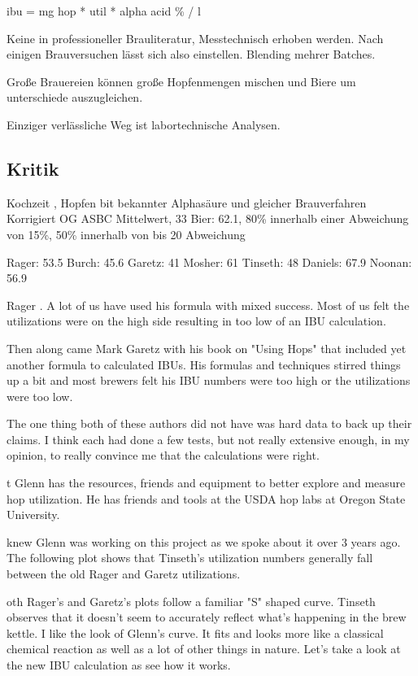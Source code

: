 \documentclass[a4paper,parskip=half]{scrartcl}
\begin{document}
\parencite[51]{Holle2010}
ibu = mg hop * util * alpha acid \% / l

\parencite[127]{Garetz1994} 
Keine in professioneller Brauliteratur, Messtechnisch erhoben
werden. Nach einigen Brauversuchen lässt sich also einstellen.
Blending mehrer Batches.

\parencite[76]{Daniels1996}
Große Brauereien können große Hopfenmengen mischen und
Biere um unterschiede auszugleichen.

\parencite[51]{Holle2010}
Einziger verlässliche Weg ist labortechnische Analysen.



\subsection*{Kritik}

\parencite{Bonham2001}
Kochzeit , Hopfen bit bekannter Alphasäure und gleicher Brauverfahren
Korrigiert OG
ASBC Mittelwert, 33 Bier: 62.1, 80\% innerhalb einer Abweichung von 15\%, 50\% innerhalb
von  bis 20 Abweichung

Rager: 53.5
Burch: 45.6
Garetz: 41
Mosher: 61
Tinseth: 48
Daniels: 67.9
Noonan: 56.9

\parencite{Jones1995}
Rager
. A lot of us have used his formula with mixed success. Most of us felt
the utilizations were on the high side resulting in too low of an IBU calculation.

Then along came Mark Garetz with his book on "Using Hops" that included yet another formula to
calculated IBUs. His formulas and techniques stirred things up a bit and most brewers felt his IBU
numbers were too high or the utilizations were too low.

The one thing both of these authors did not have was hard data to back up their claims. I think each had
done a few tests, but not really extensive enough, in my opinion, to really convince me that the
calculations were right.

t Glenn has the resources, friends
and equipment to better explore and measure hop utilization. He has friends and tools at the USDA hop
labs at Oregon State University.

knew Glenn was working on this project as we spoke about it over 3 years ago.
The following plot shows that Tinseth's utilization numbers generally fall between the
old Rager and Garetz utilizations.

oth Rager’s and Garetz’s plots follow a familiar "S" shaped curve. Tinseth observes that
it doesn't seem to accurately reflect what's happening in the brew kettle.
I like the look of Glenn's curve. It fits and looks more like a classical chemical reaction as well as a lot of
other things in nature. Let’s take a look at the new IBU calculation as see how it works.
\end{document}
